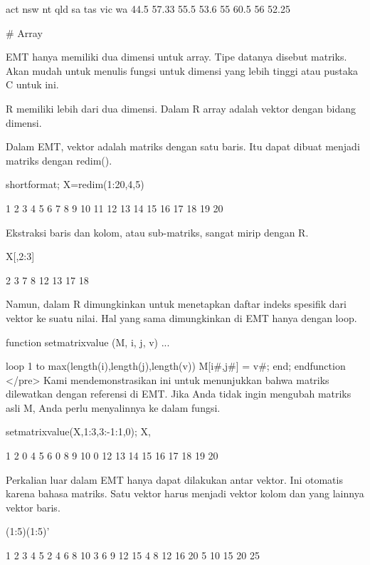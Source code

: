 \documentclass{article}
\begin{document}
        act    nsw     nt    qld     sa    tas    vic     wa
       44.5  57.33   55.5   53.6     55   60.5     56  52.25

# Array

EMT hanya memiliki dua dimensi untuk array. Tipe datanya disebut
matriks. Akan mudah untuk menulis fungsi untuk dimensi yang lebih
tinggi atau pustaka C untuk ini.


R memiliki lebih dari dua dimensi. Dalam R array adalah vektor dengan
bidang dimensi.


Dalam EMT, vektor adalah matriks dengan satu baris. Itu dapat dibuat
menjadi matriks dengan redim().


\>shortformat; X=redim(1:20,4,5)


            1         2         3         4         5 
            6         7         8         9        10 
           11        12        13        14        15 
           16        17        18        19        20 

Ekstraksi baris dan kolom, atau sub-matriks, sangat mirip dengan R.


\>X[,2:3]


            2         3 
            7         8 
           12        13 
           17        18 

Namun, dalam R dimungkinkan untuk menetapkan daftar indeks spesifik
dari vektor ke suatu nilai. Hal yang sama dimungkinkan di EMT hanya
dengan loop.


\>function setmatrixvalue (M, i, j, v) ...


    loop 1 to max(length(i),length(j),length(v))
       M[i{#},j{#}] = v{#};
    end;
    endfunction
</pre>
Kami mendemonstrasikan ini untuk menunjukkan bahwa matriks dilewatkan
dengan referensi di EMT. Jika Anda tidak ingin mengubah matriks asli
M, Anda perlu menyalinnya ke dalam fungsi.


\>setmatrixvalue(X,1:3,3:-1:1,0); X,


            1         2         0         4         5 
            6         0         8         9        10 
            0        12        13        14        15 
           16        17        18        19        20 

Perkalian luar dalam EMT hanya dapat dilakukan antar vektor. Ini
otomatis karena bahasa matriks. Satu vektor harus menjadi vektor kolom
dan yang lainnya vektor baris.


\>(1:5)\*(1:5)'


            1         2         3         4         5 
            2         4         6         8        10 
            3         6         9        12        15 
            4         8        12        16        20 
            5        10        15        20        25 
\end{document}
